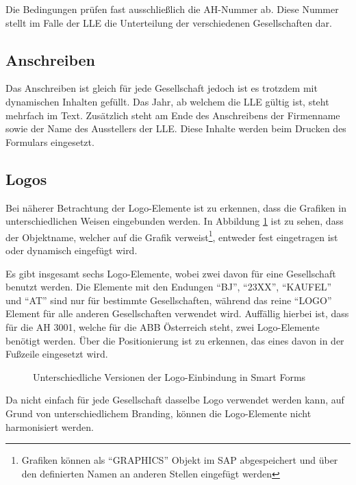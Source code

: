 	Die Bedingungen prüfen fast ausschließlich die \ac{AH}-Nummer ab. Diese Nummer stellt im Falle der \ac{LLE} die Unterteilung der verschiedenen Gesellschaften dar.
\FloatBarrier


	\subsection{Anschreiben}
	
	Das Anschreiben ist gleich für jede Gesellschaft jedoch ist es trotzdem mit dynamischen Inhalten gefüllt. Das Jahr, ab welchem die \ac{LLE} gültig ist, steht mehrfach im Text. Zusätzlich steht am Ende des Anschreibens der Firmenname sowie der Name des Ausstellers der \ac{LLE}. Diese Inhalte werden beim Drucken des Formulars eingesetzt.	
	
	\subsection{Logos}
	\label{ist_logos}
	
	Bei näherer Betrachtung der Logo-Elemente ist zu erkennen, dass die Grafiken in unterschiedlichen Weisen eingebunden werden. In Abbildung \ref{logo_smart} ist zu sehen, dass der Objektname, welcher auf die Grafik verweist\footnote{Grafiken können als "`GRAPHICS"' Objekt im SAP abgespeichert und über den definierten Namen an anderen Stellen eingefügt werden}, entweder fest eingetragen ist oder dynamisch eingefügt wird. 
	

	Es gibt insgesamt sechs Logo-Elemente, wobei zwei davon für eine Gesellschaft benutzt werden. Die Elemente mit den Endungen "`BJ"', "`23XX"', "`KAUFEL"' und "`AT"' sind nur für bestimmte Gesellschaften, während das reine "`LOGO"' Element für alle anderen Gesellschaften verwendet wird. Auffällig hierbei ist, dass für die \ac{AH} 3001, welche für die ABB Österreich steht, zwei Logo-Elemente benötigt werden.
	Über die Positionierung ist zu erkennen, das eines davon in der Fußzeile eingesetzt wird.
	
		\begin{figure}[ht]
		\centering
		\caption{Unterschiedliche Versionen der Logo-Einbindung in Smart Forms}
		\label{logo_smart}
	\end{figure} 
	Da nicht einfach für jede Gesellschaft dasselbe Logo verwendet werden kann, auf Grund von unterschiedlichem Branding, können die Logo-Elemente nicht harmonisiert werden.
	
